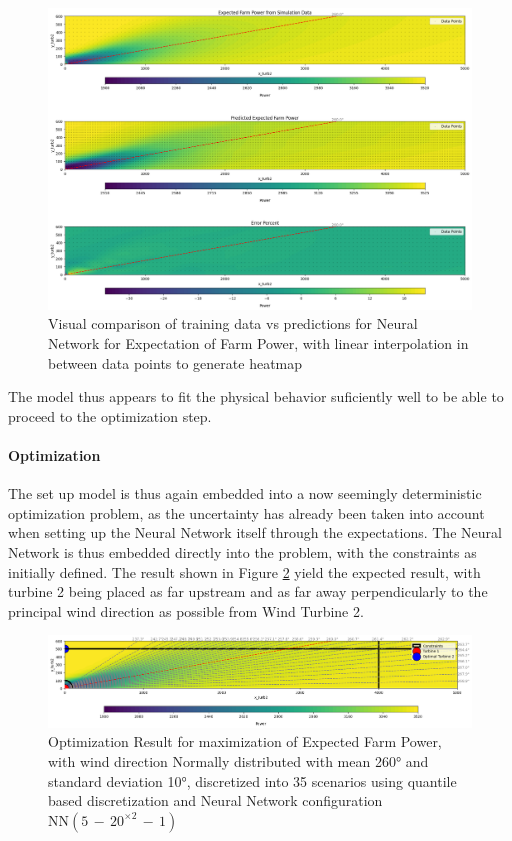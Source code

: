 \documentclass[preprint,12pt]{elsarticle}
\begin{document}
\begin{figure}[h] 
	\centering
	\includegraphics[width=1\textwidth]{../figures/optimization/stoch2/stoch2_heatmap_inspect_NN.png} 
	\caption{Visual comparison of training data vs predictions for Neural Network for Expectation of Farm Power, with linear interpolation in between data points to generate heatmap}
	\label{fig:stoch2_heatmap_inspect_NN}
\end{figure} 

The model thus appears to fit the physical behavior suficiently well to be able to proceed to the optimization step. 



\paragraph{Optimization}

The set up model is thus again embedded into a now seemingly deterministic optimization problem, as the uncertainty has already been taken into account when setting up the Neural Network itself through the expectations. The Neural Network is thus embedded directly into the problem, with the constraints as initially defined. The result shown in Figure \ref{fig:stoch2_opti} yield the expected result, with turbine 2 being placed as far upstream and as far away perpendicularly to the principal wind direction as possible from Wind Turbine 2. 

\begin{figure}[h] 
	\centering
	\includegraphics[width=1\textwidth]{../figures/optimization/stoch2/stoch2_opti.png} 
	\caption{Optimization Result for maximization of Expected Farm Power, with wind direction Normally distributed with mean 260° and standard deviation 10°, discretized into 35 scenarios using quantile based discretization and Neural Network configuration $\text{NN}(5\,{-}\,20^{\times2}\,{-}\,1)$ }
	\label{fig:stoch2_opti}
\end{figure} 
\end{document}
